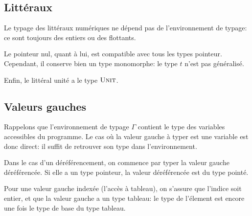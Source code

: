 \subsection*{Littéraux}

Le typage des littéraux numériques ne dépend pas de l'environnement de typage:
ce sont toujours des entiers ou des flottants.

\begin{mathpar}



\end{mathpar}

Le pointeur nul, quant à lui, est compatible avec tous les types pointeur.
Cependant, il conserve bien un type monomorphe: le type $t$ n'est pas
généralisé.

\begin{mathpar}
\end{mathpar}

Enfin, le littéral unité a le type $\tUnit$.

\begin{mathpar}
\end{mathpar}

\subsection*{Valeurs gauches}

Rappelons que l'environnement de typage $Γ$ contient le type des variables
accessibles du programme. Le cas où la valeur gauche à typer est une variable est
donc direct: il suffit de retrouver son type dans l'environnement.

\begin{mathpar}
\end{mathpar}

Dans le cas d'un déréférencement, on commence par typer la valeur gauche
déréférencée. Si elle a un type pointeur, la valeur déréférencée est du type
pointé.

\begin{mathpar}
\end{mathpar}

Pour une valeur gauche indexée (l'accès à tableau), on s'assure que l'indice soit
entier, et que la valeur gauche a un type tableau: le type de l'élement est encore
une fois le type de base du type tableau.

